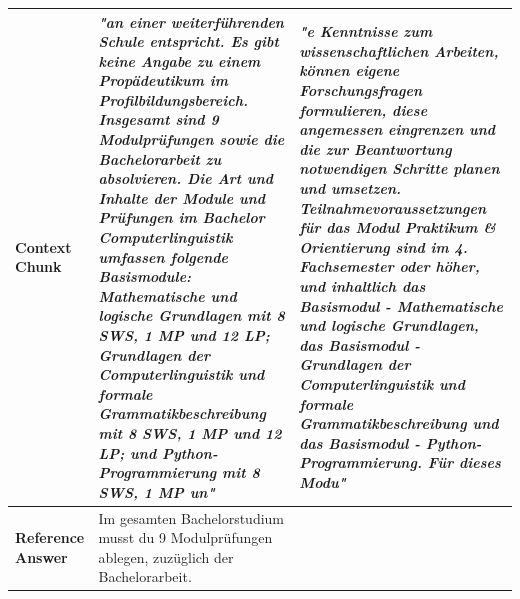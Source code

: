 \documentclass[12pt]{article} %
\begin{document}
\begin{table}[htbp]
\begin{tabularx}{\textwidth}{l X X}
        \midrule
        \textbf{Context Chunk}                                                                                                                                                                                                                                                                                                                                                                                                                                                                                                              &
        \textit{"an einer weiterf\"uhrenden Schule entspricht. Es gibt keine Angabe zu einem Prop\"adeutikum im Profilbildungsbereich. Insgesamt sind 9 Modulpr\"ufungen sowie die Bachelorarbeit zu absolvieren. Die Art und Inhalte der Module und Pr\"ufungen im Bachelor Computerlinguistik umfassen folgende Basismodule: Mathematische und logische Grundlagen mit 8 SWS, 1 MP und 12 LP; Grundlagen der Computerlinguistik und formale Grammatikbeschreibung mit 8 SWS, 1 MP und 12 LP; und Python-Programmierung mit 8 SWS, 1 MP un"} &
        \textit{"e Kenntnisse zum wissenschaftlichen Arbeiten, k\"onnen eigene Forschungsfragen formulieren, diese angemessen eingrenzen und die zur Beantwortung notwendigen Schritte planen und umsetzen. Teilnahmevoraussetzungen f\"ur das Modul Praktikum \& Orientierung sind im 4. Fachsemester oder h\"oher, und inhaltlich das Basismodul - Mathematische und logische Grundlagen, das Basismodul - Grundlagen der Computerlinguistik und formale Grammatikbeschreibung und das Basismodul - Python-Programmierung. F\"ur dieses Modu"}                                                                                                    \\
        \midrule
        \textbf{Reference Answer}                                                                                                                                                                                                                                                                                                                                                                                                                                                                                                             &
        Im gesamten Bachelorstudium musst du 9 Modulpr\"ufungen ablegen, zuz\"uglich der Bachelorarbeit.                                                                                                                                                                                                                                                                                                                                                                                                                                      &

\end{tabularx}
\end{table}
\end{document}
